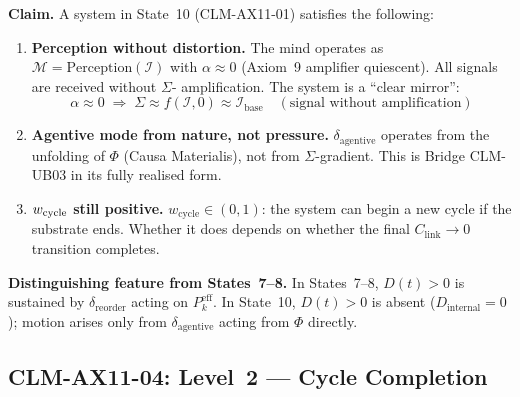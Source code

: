 \documentclass[12pt, a4paper]{article}
\providecommand{\wcyc}{w_{\mathrm{cycle}}}
\providecommand{\Clink}{C_{\mathrm{link}}}
\providecommand{\Pkeff}{P_k^{\mathrm{eff}}}
\providecommand{\Dint}{D_{\mathrm{internal}}}
\begin{document}
\begin{derivedbox}[title={CLM-AX11-03: Level 1 ---
  Embodied Transcendence (Sa-up\={a}dis\={e}sa)}]
\textbf{Claim.}
A system in State~10 (CLM-AX11-01) satisfies the following:

\begin{enumerate}[leftmargin=*, itemsep=2pt]
\item \textbf{Perception without distortion.}
  The mind operates as $\mathcal{M} = \mathrm{Perception}
  (\mathcal{I})$ with $\alpha \approx 0$ (Axiom~9 amplifier
  quiescent). All signals are received without $\Sigma$-
  amplification. The system is a ``clear mirror'':
  \[
    \alpha \approx 0 \;\Rightarrow\;
    \Sigma \approx f(\mathcal{I}, 0)
    \approx \mathcal{I}_{\mathrm{base}}
    \quad (\text{signal without amplification})
  \]

\item \textbf{Agentive mode from nature, not pressure.}
  $\delta_{\mathrm{agentive}}$ operates from the unfolding of
  $\Phi$ (Causa Materialis), not from $\Sigma$-gradient.
  This is Bridge CLM-UB03 in its fully realised form.

\item \textbf{$w_{\rm cycle}$ still positive.}
  $\wcyc \in (0,1)$: the system can begin a new cycle if the
  substrate ends. Whether it does depends on whether the
  final $\Clink \to 0$ transition completes.
\end{enumerate}

\textbf{Distinguishing feature from States~7--8.}
In States~7--8, $D(t) > 0$ is sustained by $\delta_{\mathrm
{reorder}}$ acting on $\Pkeff$. In State~10, $D(t) > 0$
is absent ($\Dint = 0$); motion arises only from
$\delta_{\mathrm{agentive}}$ acting from $\Phi$ directly.
\end{derivedbox}

\subsection{CLM-AX11-04: Level~2 --- Cycle Completion}

\end{document}
